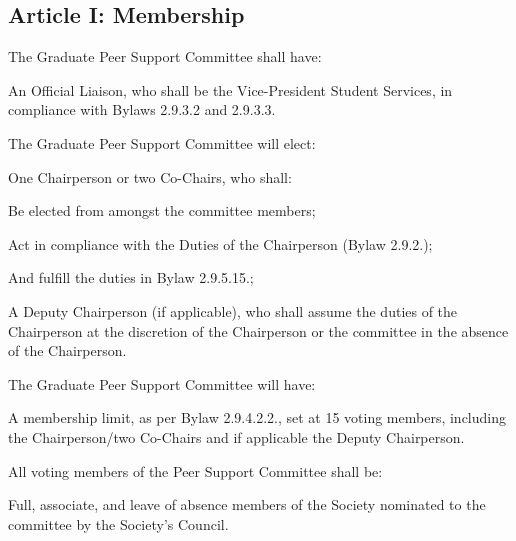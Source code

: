 \subsection{Article I: Membership}
\begin{longenum}[ label*=\thesubsection.\arabic*., align=left] 	
\item The Graduate Peer Support Committee shall have:
	\begin{longenum}[label*=\arabic*., align=left]	
	\item An Official Liaison, who shall be the Vice-President Student Services, in compliance with Bylaws 2.9.3.2 and 2.9.3.3.
	\end{longenum}
\item The Graduate Peer Support Committee will elect:
	\begin{longenum}[label*=\arabic*., align=left]
	\item One Chairperson or two Co-Chairs, who shall:
		\begin{longenum}[label*=\arabic*., align=left]
		\item Be elected from amongst the committee members;
		\item Act in compliance with the Duties of the Chairperson (Bylaw 2.9.2.);
		\item And fulfill the duties in Bylaw 2.9.5.15.;
		\end{longenum}
	\item A Deputy Chairperson (if applicable), who shall assume the duties of the Chairperson at the discretion of the Chairperson or the committee in the absence of the Chairperson.
	\end{longenum}
\item The Graduate Peer Support Committee will have:
	\begin{longenum}[label*=\arabic*., align=left]
	\item A membership limit, as per Bylaw 2.9.4.2.2., set at 15 voting members, including the Chairperson/two Co-Chairs and if applicable the Deputy Chairperson.
	\end{longenum}
\item All voting members of the Peer Support Committee shall be:
	\begin{longenum}[label*=\arabic*., align=left]
	\item Full, associate, and leave of absence members of the Society nominated to the committee by the Society’s Council.   
	\end{longenum}
\end{longenum}

